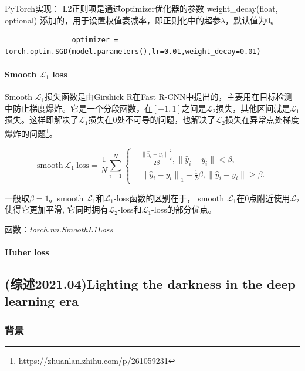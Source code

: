\documentclass[letterpaper,12pt]{article}
\begin{document}
			PyTorch实现： L2正则项是通过optimizer优化器的参数 weight\_decay(float, optional) 添加的，用于设置权值衰减率，即正则化中的超参$\lambda$，默认值为0。
			
			\lstset{language=python}
			\begin{lstlisting}
				optimizer = torch.optim.SGD(model.parameters(),lr=0.01,weight_decay=0.01)
			\end{lstlisting}

			\paragraph{Smooth $\mathcal{L}_1$ loss}
	
			Smooth $\mathcal{L}_1$损失函数是由Girshick R在Fast R-CNN中提出的，主要用在目标检测中防止梯度爆炸。它是一个分段函数，在$\left[-1,1\right]$之间是$\mathcal{L}_2$损失，其他区间就是$\mathcal{L}_1$损失。这样即解决了$\mathcal{L}_1$损失在0处不可导的问题，也解决了$\mathcal{L}_2$损失在异常点处梯度爆炸的问题\footnote{https://zhuanlan.zhihu.com/p/261059231}。
			
			\begin{equation}
				\text{smooth} \ \mathcal{L}_1 \ \text{loss} = \frac{1}{N}\sum_{i=1}^{N}
				\left\{
				\begin{aligned}
					&\frac{{\|\hat{y}_i - y_i \|}_2^{2}}{2\beta}, \| \hat{y}_i -y_i \| < \beta , \\
					&{\|\hat{y}_i - y_i \|}_1 - \frac{1}{2}\beta, \| \hat{y}_i -y_i \| \geq \beta.
				\end{aligned}
				\right.
			\end{equation}		
	
			一般取$\beta=1$。smooth $\mathcal{L}_1$和$\mathcal{L}_1$-loss函数的区别在于， smooth $\mathcal{L}_1$在0点附近使用$\mathcal{L}_2$使得它更加平滑, 它同时拥有$\mathcal{L}_2$-loss和$\mathcal{L}_1$-loss的部分优点。
	
			函数：\textit{torch.nn.SmoothL1Loss}
			
			\paragraph{Huber loss}
	
	\subsection{(综述2021.04)Lighting the darkness in the deep learning era}
	
	\subsubsection{背景}
	
\end{document}

